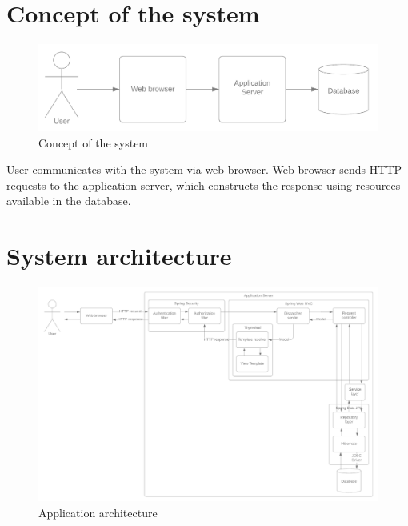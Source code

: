 \documentclass[a4paper,twoside,12pt]{book}
\begin{document}
  \section{Concept of the system}
    \begin{figure}[h]
      \includegraphics[width=\linewidth]{system_concept.png}
      \caption{Concept of the system}
      \label{fig:system_concept}
    \end{figure}

    User communicates with the system via web browser. 
    Web browser sends HTTP requests to the application server, which constructs the response using resources available in the database.

  \section{System architecture}
    \begin{figure}[h]
      \includegraphics[width=\linewidth]{architecture_diagram.png}
      \caption{Application architecture}
      \label{fig:architecture_diagram}
    \end{figure}
\end{document}

